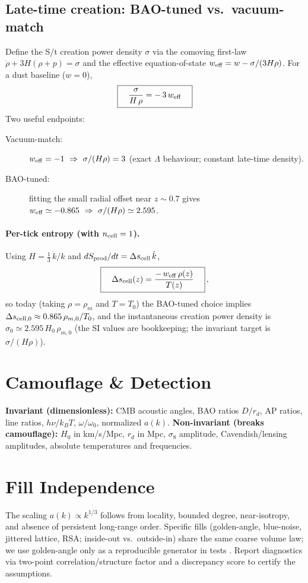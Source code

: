 \documentclass[11pt,oneside]{article}
\begin{document}
\subsection{Late-time creation: BAO-tuned vs.\ vacuum-match}
Define the S/t creation power density $\sigma$ via the comoving first-law
$\dot\rho+3H(\rho+p)=\sigma$ and the effective equation-of-state
$w_{\rm eff}=w-\sigma/(3H\rho)$. For a dust baseline ($w=0$),
\begin{equation}\label{eq:creation-strength}
\boxed{\quad \frac{\sigma}{H\,\rho}=-\,3\,w_{\rm eff}\quad}
\end{equation}
Two useful endpoints:
\begin{description}
  \item[Vacuum-match:] $w_{\rm eff}=-1\ \Rightarrow\ \sigma/(H\rho)=3$ (exact $\Lambda$ behaviour; constant late-time density).
  \item[BAO-tuned:] fitting the small radial offset near $z\sim0.7$ gives $w_{\rm eff}\simeq -0.865\ \Rightarrow\ \sigma/(H\rho)\simeq 2.595$.
\end{description}

\paragraph{Per-tick entropy (with $n_{\rm cell}=1$).}
Using $H=\tfrac13\,\dot k/k$ and $dS_{\rm prod}/dt=\Delta s_{\rm cell}\,\dot k$,
\begin{equation}\label{eq:delta-s-cell}
\boxed{\quad \Delta s_{\rm cell}(z)=\frac{-\,w_{\rm eff}\,\rho(z)}{T(z)}\quad}\,,
\end{equation}
so today (taking $\rho=\rho_m$ and $T=T_0$) the BAO-tuned choice implies
$\Delta s_{\rm cell,0}\approx 0.865\,\rho_{m,0}/T_0$, and the instantaneous creation power density is
$\sigma_0\simeq 2.595\,H_0\,\rho_{m,0}$ (the SI values are bookkeeping; the invariant target is $\sigma/(H\rho)$).

\section{Camouflage \& Detection}
\textbf{Invariant (dimensionless):} CMB acoustic angles, BAO ratios $D/r_d$, AP ratios, line ratios, $h\nu/k_BT$, $\omega/\omega_0$, normalized $a(k)$.
\textbf{Non-invariant (breaks camouflage):} $H_0$ in km/s/Mpc, $r_d$ in Mpc, $\sigma_8$ amplitude, Cavendish/lensing amplitudes, absolute temperatures and frequencies.

\section{Fill Independence}
The scaling $a(k)\propto k^{1/3}$ follows from locality, bounded degree, near-isotropy, and absence of persistent long-range order.
Specific fills (golden-angle, blue-noise, jittered lattice, RSA; inside-out vs.\ outside-in) share the same coarse volume law; we use golden-angle only as a reproducible generator in tests \cite{livio2002golden,jean1994phyllotaxis}.
Report diagnostics via two-point correlation/structure factor and a discrepancy score to certify the assumptions.
\end{document}
